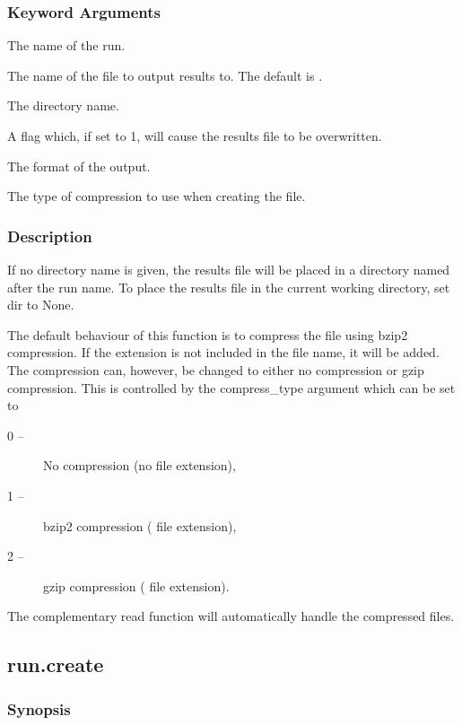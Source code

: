 \subsubsection{Keyword Arguments}


  The name of the run.

  The name of the file to output results to.  The default is 
.

  The directory name.

  A flag which, if set to 1, will cause the results file to be overwritten.

  The format of the output.

  The type of compression to use when creating the file.

\subsubsection{Description}

If no directory name is given, the results file will be placed in a directory named after
the run name.  To place the results file in the current working directory, set dir to None.

The default behaviour of this function is to compress the file using bzip2 compression.  If
the extension 
 is not included in the file name, it will be added.  The compression
can, however, be changed to either no compression or gzip compression.  This is controlled
by the compress\_type argument which can be set to

\begin{description}
\item[    0 --]   No compression (no file extension),
\item[    1 --]   bzip2 compression (
 file extension),
\item[    2 --]   gzip compression (
 file extension).
\end{description}

The complementary read function will automatically handle the compressed files.


\newpage

\subsection{run.create}


\subsubsection{Synopsis}

